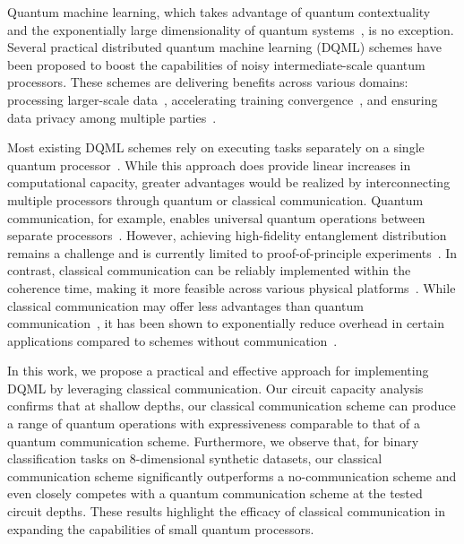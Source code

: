 \documentclass[aps,prx,reprint,amsmath,amssymb,superscriptaddress,nobibnotes,showpacs]{revtex4-2}
\begin{document}
Quantum machine learning, which takes advantage of  quantum contextuality~\cite{deng2017quantum, bowles2023contextuality} and the exponentially large dimensionality of quantum systems~\cite{biamonte2017quantum,havlivcek2019supervised,cerezo2022challenges, abbas2021power}, is no exception. Several practical distributed quantum machine learning (DQML) schemes have been proposed to boost the capabilities of noisy intermediate-scale quantum processors. These schemes are delivering benefits across various domains: processing larger-scale data~\cite{pira2023invitation,marshall2023high}, accelerating training convergence~\cite{du2021accelerating, chen2021federated}, and ensuring data privacy among multiple parties~\cite{neumann2022distributed}. 


Most existing DQML schemes rely on executing tasks separately on a single quantum processor~\cite{pira2023invitation,du2021accelerating,chen2021federated,marshall2023high}. While this approach does provide linear increases in computational capacity, greater advantages would be realized by  interconnecting multiple processors through quantum or classical communication. Quantum communication, for example, enables universal quantum operations between separate processors~\cite{gottesman1999demonstrating,eisert2000optimal}. However, achieving high-fidelity entanglement distribution remains a challenge and is currently limited to proof-of-principle experiments~\cite{chou2018deterministic,cacciapuoti2019quantum,zhong2021deterministic}. 
In contrast, classical communication can be reliably implemented within the coherence time, making it more feasible across various physical platforms~\cite{lis2023Midcircuit,corcoles2021exploiting}. While classical communication may offer less advantages than quantum communication~\cite{eddins2022doubling}, it has been shown to exponentially reduce overhead in certain applications compared to schemes without communication~\cite{piveteau2023circuit}. 

In this work, we propose a practical and effective approach for implementing DQML by leveraging classical communication. Our circuit capacity analysis confirms that at shallow depths, our classical communication scheme can produce a range of quantum operations with expressiveness comparable to that of a quantum communication scheme. Furthermore, we observe that, for binary classification tasks on 8-dimensional synthetic datasets, our classical communication scheme significantly outperforms a no-communication scheme and even closely competes with a quantum communication scheme at the tested circuit depths. These results highlight the efficacy of classical communication in expanding the capabilities of small quantum processors.\\
\end{document}

